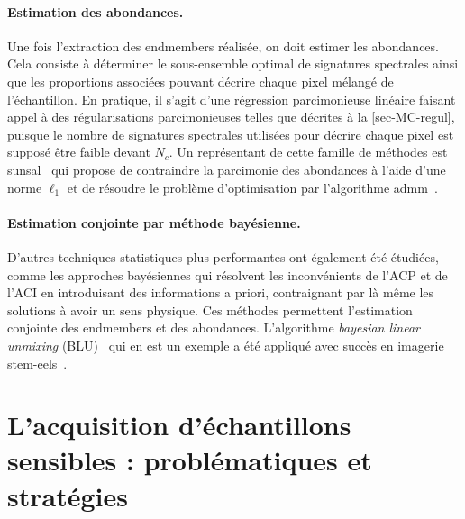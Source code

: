     \paragraph{Estimation des abondances.} Une fois l'extraction des endmembers réalisée, on doit estimer les abondances.  Cela consiste à déterminer le sous-ensemble optimal de signatures spectrales ainsi que les proportions associées pouvant décrire chaque pixel mélangé de l'échantillon. En pratique, il s'agit d'une régression parcimonieuse linéaire faisant appel à des régularisations parcimonieuses telles que décrites à la \cref{sec-MC-regul}, puisque le nombre de signatures spectrales utilisées pour décrire chaque pixel est supposé être faible devant $N_c$. Un représentant de cette famille de méthodes est \gls{sunsal}~\cite{bioucas2010alternating} qui propose de contraindre la parcimonie des abondances à l'aide d'une norme $\ell_1$ et de résoudre le problème d'optimisation par l'algorithme \gls{admm}~\cite{eckstein1992douglas, combettes2011proximal}.
    
    \paragraph{Estimation conjointe par méthode bayésienne.} D'autres techniques statistiques plus performantes ont également été étudiées, comme les approches bayésiennes qui résolvent les inconvénients de l'ACP et de l'ACI en introduisant des informations a priori, contraignant par là même les solutions à avoir un sens physique. Ces méthodes permettent l'estimation conjointe des endmembers et des abondances. L'algorithme \textit{bayesian linear unmixing} (BLU)~\cite{dobigeon2009joint} qui en est un exemple a été appliqué avec succès en imagerie \gls{stem}-\gls{eels}~\cite{dobigeon2012spectral}.
    
    
    \section{L'acquisition d'échantillons sensibles : problématiques et stratégies}\label{sec-ech-sensibles}

